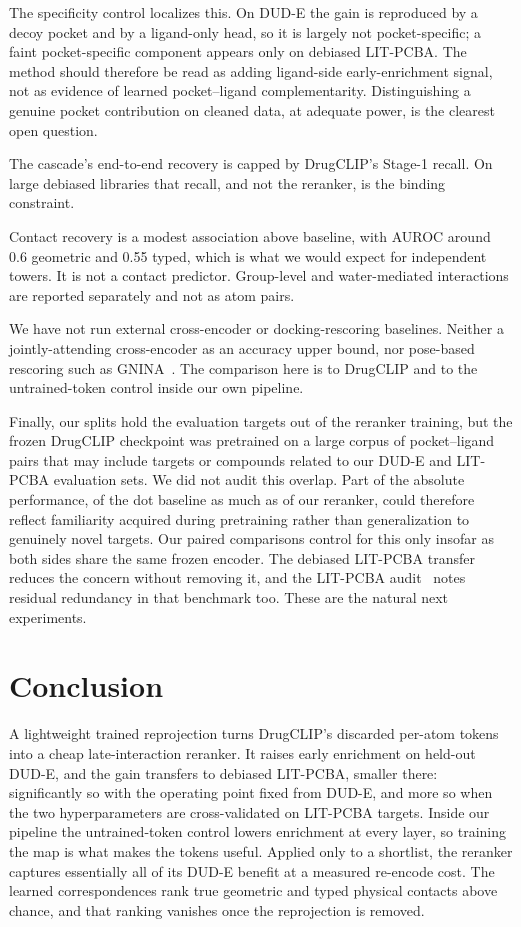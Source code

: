 \documentclass[10pt,letterpaper,twocolumn]{article}
\begin{document}
The specificity control localizes this. On DUD-E the gain is reproduced by a decoy pocket and by a ligand-only head, so it is largely not pocket-specific; a faint pocket-specific component appears only on debiased LIT-PCBA. The method should therefore be read as adding ligand-side early-enrichment signal, not as evidence of learned pocket--ligand complementarity. Distinguishing a genuine pocket contribution on cleaned data, at adequate power, is the clearest open question.

The cascade's end-to-end recovery is capped by DrugCLIP's Stage-1 recall. On large debiased libraries that recall, and not the reranker, is the binding constraint.

Contact recovery is a modest association above baseline, with AUROC around 0.6 geometric and 0.55 typed, which is what we would expect for independent towers. It is not a contact predictor. Group-level and water-mediated interactions are reported separately and not as atom pairs.

We have not run external cross-encoder or docking-rescoring baselines. Neither a jointly-attending cross-encoder as an accuracy upper bound, nor pose-based rescoring such as GNINA~\cite{gnina}. The comparison here is to DrugCLIP and to the untrained-token control inside our own pipeline.

Finally, our splits hold the evaluation targets out of the reranker training, but the frozen DrugCLIP checkpoint was pretrained on a large corpus of pocket--ligand pairs that may include targets or compounds related to our DUD-E and LIT-PCBA evaluation sets. We did not audit this overlap. Part of the absolute performance, of the dot baseline as much as of our reranker, could therefore reflect familiarity acquired during pretraining rather than generalization to genuinely novel targets. Our paired comparisons control for this only insofar as both sides share the same frozen encoder. The debiased LIT-PCBA transfer reduces the concern without removing it, and the LIT-PCBA audit~\cite{litpcbaaudit} notes residual redundancy in that benchmark too. These are the natural next experiments.

\section{Conclusion}

A lightweight trained reprojection turns DrugCLIP's discarded per-atom tokens into a cheap late-interaction reranker. It raises early enrichment on held-out DUD-E, and the gain transfers to debiased LIT-PCBA, smaller there: significantly so with the operating point fixed from DUD-E, and more so when the two hyperparameters are cross-validated on LIT-PCBA targets. Inside our pipeline the untrained-token control lowers enrichment at every layer, so training the map is what makes the tokens useful. Applied only to a shortlist, the reranker captures essentially all of its DUD-E benefit at a measured re-encode cost. The learned correspondences rank true geometric and typed physical contacts above chance, and that ranking vanishes once the reprojection is removed.
\end{document}
